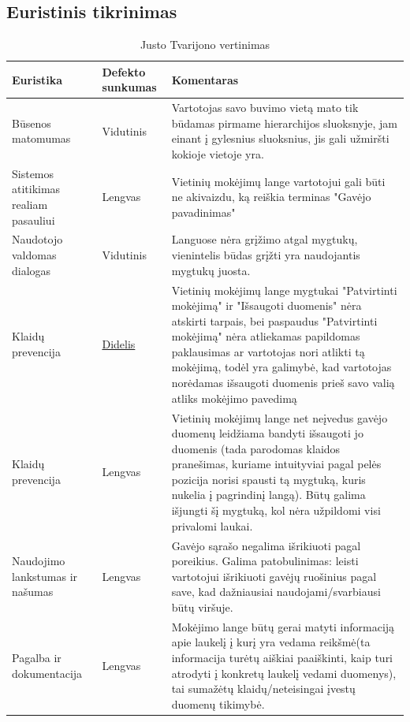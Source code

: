 \documentclass[oneside]{VUMIFPSkursinis}
\begin{document}
\subsection{Euristinis tikrinimas}
\begin{center}
	\begin{table}[h]
\begin{tabular}{|p{3.5cm}|p{3.5cm}|p{8.1cm}|}
  \hline
	Euristika & Defekto sunkumas & Komentaras \\ \hline
	Būsenos matomumas & Vidutinis & Vartotojas savo buvimo vietą mato tik būdamas pirmame hierarchijos sluoksnyje, jam einant į gylesnius sluoksnius, jis gali užmiršti kokioje vietoje yra. \\ \hline
	Sistemos atitikimas realiam pasauliui & Lengvas & Vietinių mokėjimų lange vartotojui gali būti ne akivaizdu, ką reiškia terminas "Gavėjo pavadinimas" \\ \hline
	Naudotojo valdomas dialogas & Vidutinis & Languose nėra grįžimo atgal mygtukų, vienintelis būdas grįžti yra naudojantis mygtukų juosta. \\ \hline
	Klaidų prevencija \label{lentele:klaiduPrevencijaJ} &\hyperref[fig:klaiduPrevencijaMygtukai]{Didelis} & Vietinių mokėjimų lange mygtukai "Patvirtinti mokėjimą" ir "Išsaugoti duomenis" nėra atskirti tarpais, bei paspaudus "Patvirtinti mokėjimą" nėra atliekamas papildomas paklausimas ar vartotojas nori atlikti tą mokėjimą, todėl yra galimybė, kad vartotojas norėdamas išsaugoti duomenis prieš savo valią atliks mokėjimo pavedimą\\ \hline
	Klaidų prevencija & Lengvas & Vietinių mokėjimų lange net neįvedus gavėjo duomenų leidžiama bandyti išsaugoti jo duomenis (tada parodomas klaidos pranešimas, kuriame intuityviai pagal pelės pozicija norisi spausti tą mygtuką, kuris nukelia į pagrindinį langą). Būtų galima išjungti šį mygtuką, kol nėra užpildomi visi privalomi laukai. \\ \hline
	Naudojimo lankstumas ir našumas & Lengvas & Gavėjo sąrašo negalima išrikiuoti pagal poreikius. Galima patobulinimas: leisti vartotojui išrikiuoti gavėjų ruošinius pagal save, kad dažniausiai naudojami/svarbiausi būtų viršuje. \\ \hline
	Pagalba ir dokumentacija & Lengvas & Mokėjimo lange būtų gerai matyti informaciją apie laukelį į kurį yra vedama reikšmė(ta informacija turėtų aiškiai paaiškinti, kaip turi atrodyti į konkretų laukelį vedami duomenys), tai sumažėtų klaidų/neteisingai įvestų duomenų tikimybė.  \\ \hline
\end{tabular}
\caption{Justo Tvarijono vertinimas}
\end{table}
\end{center}
\end{document}
